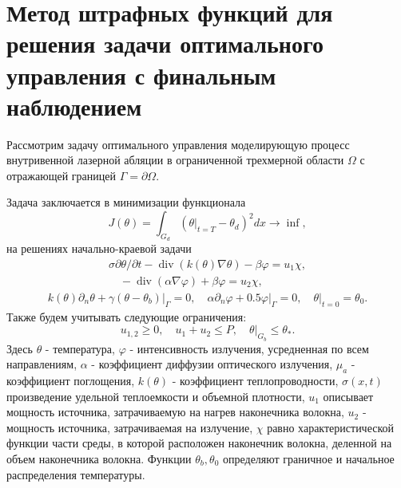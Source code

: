 \section{Метод штрафных функций для решения задачи
оптимального управления с финальным наблюдением}
\label{sec:ch3:sec3}

%
%
Рассмотрим задачу оптимального управления моделирующую процесс
внутривенной лазерной абляции в ограниченной трехмерной области
$\Omega$ с отражающей границей $\Gamma=\partial\Omega$.

Задача заключается в минимизации функционала
\[
    J(\theta)=\int_{G_{d}}\left(\left.\theta\right|_{t=T}
    -\theta_{d}\right)^{2} d x \rightarrow \inf,
\]
на решениях начально-краевой задачи
\begin{gather}
    \label{eq:3_3:1}
    \sigma \partial \theta / \partial t-\operatorname{div}(k(\theta) \nabla \theta)
    -\beta \varphi=u_{1} \chi, \\
    \quad-\operatorname{div}(\alpha \nabla \varphi)+\beta \varphi= u_{2} \chi,
\end{gather}
\begin{gather}
    \label{eq:3_3:2}
    k(\theta) \partial_{n} \theta+\left.\gamma
    \left(\theta-\theta_{b}\right)\right|_{\Gamma}=0,
    \quad \alpha \partial_{n} \varphi +
    \left.0.5 \varphi\right|_{\Gamma}=0,\left.\quad \theta\right|_{t=0}=\theta_{0}.
\end{gather}
Также будем учитывать следующие ограничения:
\[
    u_{1,2} \geq 0, \quad u_{1}+u_{2} \leq P,\left.\quad \theta\right|_{G_{b}} \leq \theta_{*}.
\]
Здесь $\theta$ - температура, $\varphi$ - интенсивность излучения, усредненная по всем направлениям,
$\alpha$ - коэффициент диффузии оптического излучения, $\mu_{a}$ - коэффициент поглощения,
$k(\theta)$ - коэффициент теплопроводности, $\sigma(x, t)$ произведение удельной теплоемкости
и объемной плотности, $u_{1}$ описывает мощность источника, затрачиваемую
на нагрев наконечника волокна, $u_{2}$ - мощность источника, затрачиваемая на излучение,
$\chi$ равно характеристической функции части среды, в которой расположен наконечник волокна,
деленной на объем наконечника волокна.
Функции $\theta_{b}, \theta_{0}$ определяют граничное и начальное распределения температуры.

